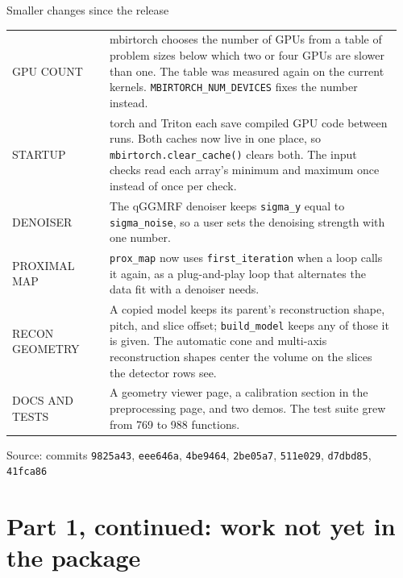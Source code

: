 \documentclass[aspectratio=169,10pt]{beamer}
\newcommand{\tagchip}[2]{{\setlength{\fboxsep}{2.5pt}\setlength{\fboxrule}{0.6pt}%
  \fcolorbox{white}{#1}{\textcolor{white}{\footnotesize\bfseries\strut #2}}}}
\newcommand{\released}{\tagchip{safeGreen}{RELEASED}}
\newcommand{\speclabel}[1]{\textcolor{inkGray}{\scriptsize\MakeUppercase{#1}}}
\newcommand{\source}[1]{\par\vfill{\scriptsize\textcolor{inkGray}{Source: #1}\par}}
\newcommand{\rowrule}{\\[3pt]\arrayrulecolor{inkGray!35}\hline\noalign{\vskip 3pt}}
\begin{document}
\begin{frame}{Smaller changes since the release \hfill \released}
  \vspace{0pt}
  {\footnotesize
  \begin{tabular}{@{}>{\raggedright\arraybackslash}p{0.24\linewidth}@{\hspace{8pt}}>{\raggedright\arraybackslash}p{0.72\linewidth}@{}}
    \speclabel{gpu count} & mbirtorch chooses the number of GPUs from a
      table of problem sizes below which two or four GPUs are slower than
      one.  The table was measured again on the current kernels.
      \texttt{MBIRTORCH\_NUM\_DEVICES} fixes the number instead. \rowrule
    \speclabel{startup} & torch and Triton each save compiled GPU code
      between runs.  Both caches now live in one place, so
      \texttt{mbirtorch.clear\_cache()} clears both.  The input checks read
      each array's minimum and maximum once instead of once per check. \rowrule
    \speclabel{denoiser} & The qGGMRF denoiser keeps \texttt{sigma\_y} equal
      to \texttt{sigma\_noise}, so a user sets the denoising strength with one
      number. \rowrule
    \speclabel{proximal map} & \texttt{prox\_map} now uses
      \texttt{first\_iteration} when a loop calls it again, as a plug-and-play
      loop that alternates the data fit with a denoiser needs. \rowrule
    \speclabel{recon geometry} & A copied model keeps its parent's
      reconstruction shape, pitch, and slice offset; \texttt{build\_model}
      keeps any of those it is given.  The automatic cone and multi-axis
      reconstruction shapes center the volume on the slices the detector rows
      see. \rowrule
    \speclabel{docs and tests} & A geometry viewer page, a calibration section
      in the preprocessing page, and two demos.  The test suite grew from 769
      to 988 functions. \\
  \end{tabular}}
  \source{commits \texttt{9825a43}, \texttt{eee646a}, \texttt{4be9464},
  \texttt{2be05a7}, \texttt{511e029}, \texttt{d7dbd85}, \texttt{41fca86}}
\end{frame}

\section{Part 1, continued: work not yet in the package}
\end{document}

